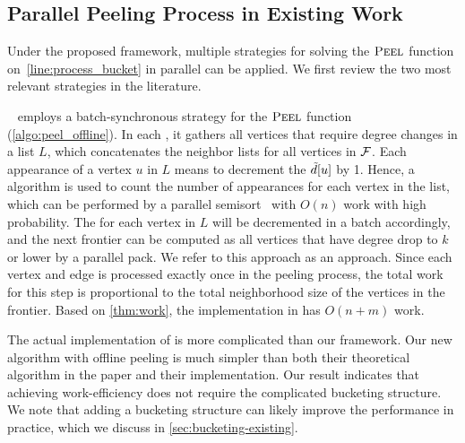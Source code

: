\subsection{Parallel Peeling Process in Existing Work}\label{sec:peeling}
Under the proposed framework, multiple strategies for solving the ${\mbox{\sc{Peel}}}$ function on~\cref{line:process_bucket} in parallel can be applied. 
We first review the two most relevant strategies in the literature. 

\Julienne{}~\cite{dhulipala2017} employs a batch-synchronous strategy for the ${\mbox{\sc{Peel}}}{}$ function (\cref{algo:peel_offline}). 
In each \subround, it gathers all vertices that require degree changes in a list $L$, 
which concatenates the neighbor lists for all vertices in ${\mathcal{F}}$. 
Each appearance of a vertex $u$ in $L$ means to decrement the \induceddegree{} $\tilde{d}[u]$ by 1. 
Hence, a  algorithm is used to count the number of appearances for each vertex in the list,
which can be performed by a parallel semisort~\cite{gu2015top,dong2023high} with $O(n)$ work with high probability. 
The \induceddegree{} for each vertex in $L$ will be decremented in a batch accordingly, and the next frontier can be computed as
all vertices that have degree drop to $k$ or lower by a parallel pack. 
We refer to this approach as an  approach. 
Since each vertex and edge is processed exactly once in the peeling process, 
the total work for this step is proportional to the total neighborhood size of the vertices in the frontier.
Based on \cref{thm:work}, the \kcore implementation in \Julienne{} has $O(n+m)$ work.



The actual implementation of \Julienne{} is more complicated than our framework. 
Our new algorithm with offline peeling is much simpler than both their theoretical algorithm in the paper and their implementation. 
Our result indicates that achieving work-efficiency does not require the complicated bucketing structure. 
We note that adding a bucketing structure can likely improve the performance in practice, which we discuss in \cref{sec:bucketing-existing}. 


